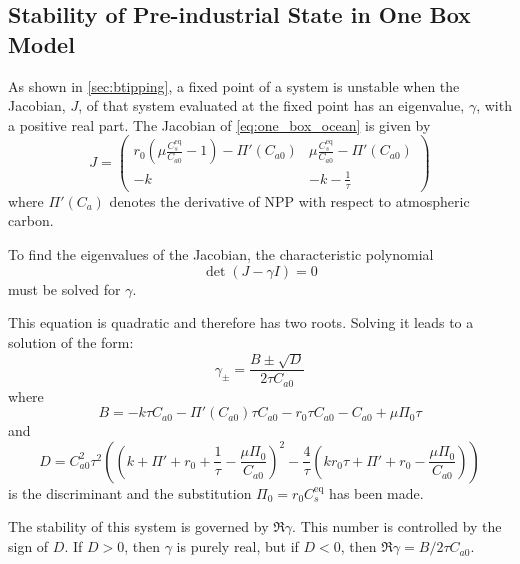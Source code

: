 \subsection{Stability of Pre-industrial State in One Box Model}
As shown in \cref{sec:btipping}, a fixed point of a system is unstable when the Jacobian, $J$, of that system evaluated at the fixed point has an eigenvalue, $\gamma$, with a positive real part.
The Jacobian of \cref{eq:one_box_ocean} is given by
\begin{equation}
  \label{eq:jacobian_of_one_box}
    J = 
    \begin{pmatrix}
    r_0 \left( \mu \frac{C_s^{\mathrm{eq}}}{C_{a0}} - 1\right) - \Pi'(C_{a0}) & 
    \mu \frac{C_s^{\mathrm{eq}}}{C_{a0}} - \Pi'(C_{a0}) \\
    -k & -k - \frac{1}{\tau}
    \end{pmatrix}
  \end{equation}
where $\Pi'(C_a)$ denotes the derivative of NPP with respect to atmospheric carbon.
  
To find the eigenvalues of the Jacobian, the characteristic polynomial
\begin{equation}
  \label{eq:char_poly}
  \det(J - \gamma I) = 0
\end{equation}
must be solved for $\gamma$.

This equation is quadratic and therefore has two roots. Solving it leads to a solution of the form:
\begin{equation}
  \label{eq:eigenvalues_of_one_box_jac}
  \gamma_{\pm} = \frac{B \pm \sqrt{D}}{2\tau C_{a0}}
\end{equation}
where
\begin{equation}
  \label{eq:B_in_one_box}
  B = -k \tau  C_{a0}-\Pi'(C_{a0}) \tau  C_{a0}-r_0 \tau  C_{a0}-C_{a0}+\mu  \Pi_0 \tau
\end{equation}
and
\begin{equation}
  \label{eq:discriminant_from_one_box}
  D = C_{a0}^2\tau^2\left(\left(k +\Pi' +r_0  +\frac{1}{\tau}-\frac{\mu  \Pi_0}{C_{a0}} \right)^2-\frac{4}{\tau}\left(k r_0 \tau +\Pi'+r_0-\frac{\mu  \Pi_0}{C_{a0}}\right)\right)
\end{equation}
is the discriminant and the substitution $\Pi_0 = r_0 C_s^{\mathrm{eq}}$ has been made.

The stability of this system is governed by $\Re \gamma$. This number is controlled by the sign of $D$. If $D > 0$, then $\gamma$ is purely real, but if $D < 0$, then
$\Re \gamma = B / 2\tau C_{a0}$. 


